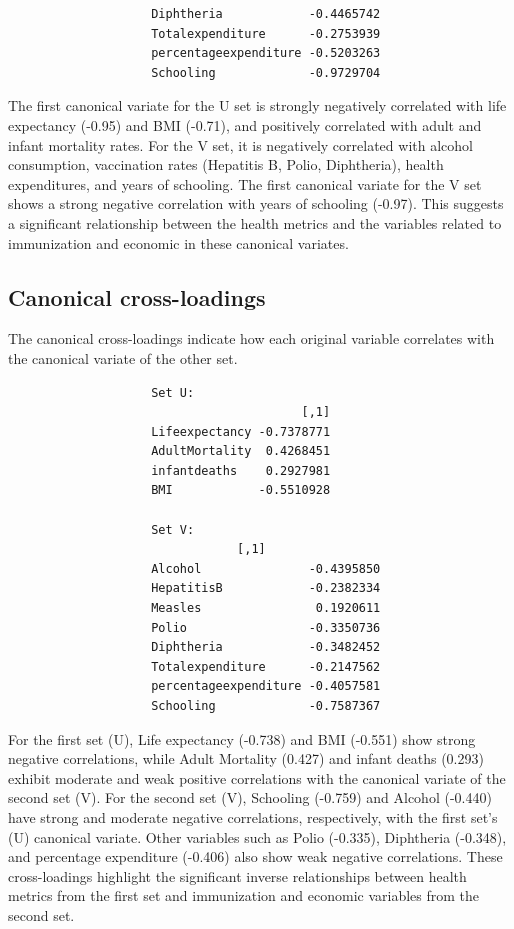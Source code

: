\documentclass[11pt]{article}
\begin{document}
			\begin{tcolorbox}[colback=white, colframe=white]
				\begin{verbatim}
					Diphtheria            -0.4465742
					Totalexpenditure      -0.2753939
					percentageexpenditure -0.5203263
					Schooling             -0.9729704 
				\end{verbatim}
			\end{tcolorbox}
			
			The first canonical variate for the U set is strongly negatively correlated with life expectancy (-0.95) and BMI (-0.71), and positively correlated with adult and infant mortality rates. For the V set, it is negatively correlated with alcohol consumption, vaccination rates (Hepatitis B, Polio, Diphtheria), health expenditures, and years of schooling. The first canonical variate for the V set shows a strong negative correlation with years of schooling (-0.97). This suggests a significant relationship between the health metrics and the variables related to immunization and economic in these canonical variates.
			
		\subsection{Canonical cross-loadings}
			The canonical cross-loadings indicate how each original variable correlates with the canonical variate of the other set. 
			
			\begin{tcolorbox}[colback=white, colframe=white]
				\begin{verbatim}
					Set U:
					                     [,1]       
					Lifeexpectancy -0.7378771 
					AdultMortality  0.4268451
					infantdeaths    0.2927981
					BMI            -0.5510928
					
					Set V:
					            [,1]    
					Alcohol               -0.4395850  
					HepatitisB            -0.2382334 
					Measles                0.1920611
					Polio                 -0.3350736 
					Diphtheria            -0.3482452
					Totalexpenditure      -0.2147562
					percentageexpenditure -0.4057581
					Schooling             -0.7587367
				\end{verbatim}
			\end{tcolorbox}
			
		For the first set (U), Life expectancy (-0.738) and BMI (-0.551) show strong negative correlations, while Adult Mortality (0.427) and infant deaths (0.293) exhibit moderate and weak positive correlations with the canonical variate of the second set (V). For the second set (V), Schooling (-0.759) and Alcohol (-0.440) have strong and moderate negative correlations, respectively, with the first set's (U) canonical variate. Other variables such as Polio (-0.335), Diphtheria (-0.348), and percentage expenditure (-0.406) also show weak negative correlations. These cross-loadings highlight the significant inverse relationships between health metrics from the first set and immunization and economic variables from the second set.
			
\end{document}
